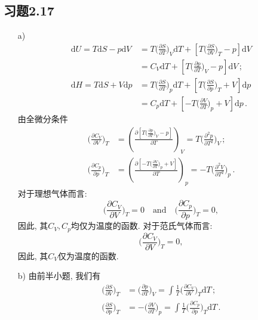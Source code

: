 \documentclass[letterpaper, 10pt]{article}
\newcommand{\dd}{\mathrm{d}}
\begin{document}
\subsection{习题2.17}
\begin{itemize}
	\item[a)]
	\begin{align*}
	\dd U = T \dd S - p \dd V & = T \bigg( \frac{\partial S}{\partial T} \bigg)_{V} \dd T + \left[ T \bigg( \frac{\partial S}{\partial V} \bigg)_{T} - p \right] \dd V \\
	& = C_{V} \dd T + \left[ T \bigg( \frac{\partial p}{\partial T} \bigg)_{V} - p \right] \dd V \,; \\
	\dd H = T \dd S + V \dd p & = T \bigg( \frac{\partial S}{\partial T} \bigg)_{p} \dd T + \left[ T \bigg( \frac{\partial S}{\partial p} \bigg)_{T} + V \right] \dd p \\
	& = C_{p} \dd T + \left[ - T \bigg( \frac{\partial V}{\partial T} \bigg)_{p} + V \right] \dd p \,.
	\end{align*}
	由全微分条件
	\begin{align*}
	\bigg( \frac{\partial C_{V}}{\partial V} \bigg)_{T} & = \left( \frac{\partial \left[ T \big( \frac{\partial p}{\partial T} \big)_{V} - p \right]}{\partial T} \right)_{V}
	= T \bigg( \frac{\partial^2 p}{\partial T^2} \bigg)_{V} \,; \\
	\bigg( \frac{\partial C_{p}}{\partial p} \bigg)_{T} & = \left( \frac{\partial \left[ - T \big( \frac{\partial V}{\partial T} \big)_{p} + V \right]}{\partial T} \right)_{p}
	= - T \bigg( \frac{\partial^2 V}{\partial T^2} \bigg)_{p} \,.
	\end{align*}
	对于理想气体而言:
	\[ \bigg( \frac{\partial C_{V}}{\partial V} \bigg)_{T} = 0 \quad{} \text{and} \quad{} \bigg( \frac{\partial C_{p}}{\partial p} \bigg)_{T} = 0, \]
	因此, 其$C_{V}, C_{p}$均仅为温度的函数. 对于范氏气体而言:
	\[ \bigg( \frac{\partial C_{V}}{\partial V} \bigg)_{T} = 0, \]
	因此, 其$C_{V}$仅为温度的函数.
	\item[b)]
	由前半小题, 我们有
	\begin{align*}
	\bigg( \frac{\partial S}{\partial V} \bigg)_{T} & = \bigg( \frac{\partial p}{\partial T} \bigg)_{V}
	= \int \frac{1}{T} \bigg( \frac{\partial C_{V}}{\partial V} \bigg)_{T} \dd T \,; \\
	\bigg( \frac{\partial S}{\partial p} \bigg)_{T} & = - \bigg( \frac{\partial V}{\partial T} \bigg)_{p}
	= \int \frac{1}{T} \bigg( \frac{\partial C_{p}}{\partial p} \bigg)_{T} \dd T \,.
	\end{align*}

\end{itemize}
\end{document}
